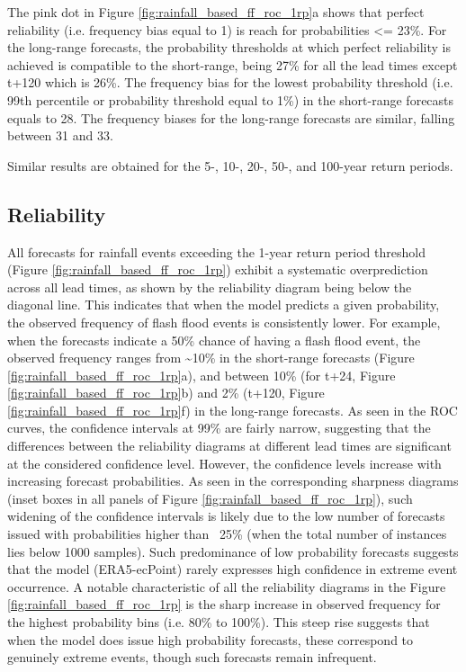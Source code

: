 The pink dot in Figure \ref{fig:rainfall_based_ff_roc_1rp}a shows that perfect reliability (i.e. frequency bias equal to 1) is reach for probabilities <= 23\%. For the long-range forecasts, the probability thresholds at which perfect reliability is achieved is compatible to the short-range, being 27\% for all the lead times except t+120 which is 26\%. The frequency bias for the lowest probability threshold (i.e. 99th percentile or probability threshold equal to 1\%) in the short-range forecasts equals to 28. The frequency biases for the long-range forecasts are similar, falling between 31 and 33. 

Similar results are obtained for the 5-, 10-, 20-, 50-, and 100-year return periods.


\subsection{Reliability}

All forecasts for rainfall events exceeding the 1-year return period threshold (Figure \ref{fig:rainfall_based_ff_roc_1rp}) exhibit a systematic overprediction across all lead times, as shown by the reliability diagram being below the diagonal line. This indicates that when the model predicts a given probability, the observed frequency of flash flood events is consistently lower. For example, when the forecasts indicate a 50\% chance of having a flash flood event, the observed frequency ranges from \sim10\% in the short-range forecasts (Figure \ref{fig:rainfall_based_ff_roc_1rp}a), and between 10\% (for t+24, Figure \ref{fig:rainfall_based_ff_roc_1rp}b) and 2\% (t+120, Figure \ref{fig:rainfall_based_ff_roc_1rp}f) in the long-range forecasts. As seen in the ROC curves, the confidence intervals at 99\% are fairly narrow, suggesting that the differences between the reliability diagrams at different lead times are significant at the considered confidence level. However, the confidence levels increase with increasing forecast probabilities. As seen in the corresponding sharpness diagrams (inset boxes in all panels of Figure \ref{fig:rainfall_based_ff_roc_1rp}), such widening of the confidence intervals is likely due to the low number of forecasts issued with probabilities higher than ~25\% (when the total number of instances lies below 1000 samples). Such predominance of low probability forecasts suggests that the model (ERA5-ecPoint) rarely expresses high confidence in extreme event occurrence. A notable characteristic of all the reliability diagrams in the Figure \ref{fig:rainfall_based_ff_roc_1rp} is the sharp increase in observed frequency for the highest probability bins (i.e. 80\% to 100\%). This steep rise suggests that when the model does issue high probability forecasts, these correspond to genuinely extreme events, though such forecasts remain infrequent.

